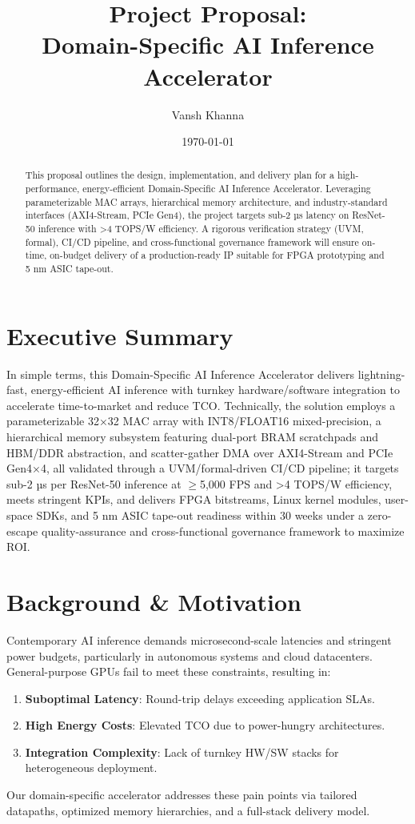 \documentclass[10pt,twocolumn]{article}
\title{\bfseries Project Proposal:\\Domain-Specific AI Inference Accelerator}
\author{Vansh Khanna}
\date{\today}
\begin{document}
\maketitle

\begin{abstract}
This proposal outlines the design, implementation, and delivery plan for a high-performance, energy-efficient Domain-Specific AI Inference Accelerator. Leveraging parameterizable MAC arrays, hierarchical memory architecture, and industry-standard interfaces (AXI4-Stream, PCIe Gen4), the project targets sub-2 µs latency on ResNet-50 inference with >4 TOPS/W efficiency. A rigorous verification strategy (UVM, formal), CI/CD pipeline, and cross-functional governance framework will ensure on-time, on-budget delivery of a production-ready IP suitable for FPGA prototyping and 5 nm ASIC tape-out.
\end{abstract}

\section*{Executive Summary}
In simple terms, this Domain-Specific AI Inference Accelerator delivers lightning-fast, energy-efficient AI inference with turnkey hardware/software integration to accelerate time-to-market and reduce TCO. Technically, the solution employs a parameterizable 32×32 MAC array with INT8/FLOAT16 mixed-precision, a hierarchical memory subsystem featuring dual-port BRAM scratchpads and HBM/DDR abstraction, and scatter-gather DMA over AXI4-Stream and PCIe Gen4×4, all validated through a UVM/formal-driven CI/CD pipeline; it targets sub-2 µs per ResNet-50 inference at $\geq$5,000 FPS and >4 TOPS/W efficiency, meets stringent KPIs, and delivers FPGA bitstreams, Linux kernel modules, user-space SDKs, and 5 nm ASIC tape-out readiness within 30 weeks under a zero-escape quality-assurance and cross-functional governance framework to maximize ROI.


\section{Background \& Motivation}
Contemporary AI inference demands microsecond-scale latencies and stringent power budgets, particularly in autonomous systems and cloud datacenters. General-purpose GPUs fail to meet these constraints, resulting in:
\begin{enumerate}
  \item \textbf{Suboptimal Latency}: Round-trip delays exceeding application SLAs.
  \item \textbf{High Energy Costs}: Elevated TCO due to power-hungry architectures.
  \item \textbf{Integration Complexity}: Lack of turnkey HW/SW stacks for heterogeneous deployment.
\end{enumerate}
Our domain-specific accelerator addresses these pain points via tailored datapaths, optimized memory hierarchies, and a full-stack delivery model.
\end{document}

